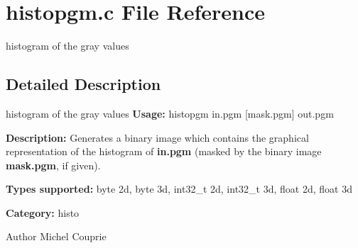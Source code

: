 \section{histopgm.c File Reference}
\label{histopgm_8c}


histogram of the gray values  




\subsection{Detailed Description}
histogram of the gray values {\bfseries Usage:} histopgm in.pgm [mask.pgm] out.pgm

{\bfseries Description:} Generates a binary image which contains the graphical representation of the histogram of {\bfseries in.pgm} (masked by the binary image {\bfseries mask.pgm}, if given).

{\bfseries Types supported:} byte 2d, byte 3d, int32\_\-t 2d, int32\_\-t 3d, float 2d, float 3d

{\bfseries Category:} histo

\begin{DoxyAuthor}{Author}
Michel Couprie 
\end{DoxyAuthor}

